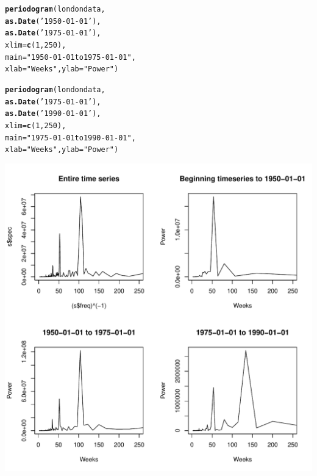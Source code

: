 \documentclass[12pt]{article}\usepackage[]{graphicx}\usepackage[]{color}
\makeatletter
\def\maxwidth{ %
  \ifdim\Gin@nat@width>\linewidth
    \linewidth
  \else
    \Gin@nat@width
  \fi
}
\newcommand{\hlnum}[1]{\textcolor[rgb]{0.686,0.059,0.569}{#1}}%
\newcommand{\hlstr}[1]{\textcolor[rgb]{0.192,0.494,0.8}{#1}}%
\newcommand{\hlstd}[1]{\textcolor[rgb]{0.345,0.345,0.345}{#1}}%
\newcommand{\hlkwc}[1]{\textcolor[rgb]{0.333,0.667,0.333}{#1}}%
\newcommand{\hlkwd}[1]{\textcolor[rgb]{0.737,0.353,0.396}{\textbf{#1}}}%
\newenvironment{kframe}{%
 \def\at@end@of@kframe{}%
 \ifinner\ifhmode%
  \def\at@end@of@kframe{\end{minipage}}%
  \begin{minipage}{\columnwidth}%
 \fi\fi%
 \def\FrameCommand##1{\hskip\@totalleftmargin \hskip-\fboxsep
 \colorbox{shadecolor}{##1}\hskip-\fboxsep
     \hskip-\linewidth \hskip-\@totalleftmargin \hskip\columnwidth}%
 \MakeFramed {\advance\hsize-\width
   \@totalleftmargin\z@ \linewidth\hsize
   \@setminipage}}%
 {\par\unskip\endMakeFramed%
 \at@end@of@kframe}
\newenvironment{knitrout}{}{} %
\makeatother
\begin{document}
\begin{enumerate}[(a)]
\begin{knitrout}
\begin{kframe}
\begin{alltt}
\hlkwd{periodogram}\hlstd{(londondata,}
            \hlkwd{as.Date}\hlstd{(}\hlstr{'1950-01-01'}\hlstd{),}
            \hlkwd{as.Date}\hlstd{(}\hlstr{'1975-01-01'}\hlstd{),}
            \hlkwc{xlim}\hlstd{=}\hlkwd{c}\hlstd{(}\hlnum{1}\hlstd{,}\hlnum{250}\hlstd{),}
            \hlkwc{main}\hlstd{=}\hlstr{"1950-01-01 to 1975-01-01"}\hlstd{,}
            \hlkwc{xlab}\hlstd{=}\hlstr{"Weeks"}\hlstd{,} \hlkwc{ylab}\hlstd{=}\hlstr{"Power"}\hlstd{)}

\hlkwd{periodogram}\hlstd{(londondata,}
            \hlkwd{as.Date}\hlstd{(}\hlstr{'1975-01-01'}\hlstd{),}
            \hlkwd{as.Date}\hlstd{(}\hlstr{'1990-01-01'}\hlstd{),}
            \hlkwc{xlim}\hlstd{=}\hlkwd{c}\hlstd{(}\hlnum{1}\hlstd{,}\hlnum{250}\hlstd{),}
            \hlkwc{main}\hlstd{=}\hlstr{"1975-01-01 to 1990-01-01"}\hlstd{,}
            \hlkwc{xlab}\hlstd{=}\hlstr{"Weeks"}\hlstd{,} \hlkwc{ylab}\hlstd{=}\hlstr{"Power"}\hlstd{)}
\end{alltt}
\end{kframe}
\includegraphics[width=\maxwidth]{figure/unnamed-chunk-4-2} 

\end{knitrout}


\end{enumerate}
\end{document}
